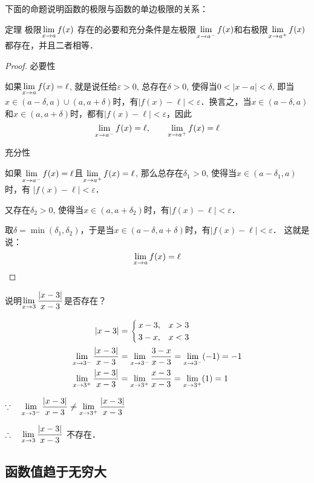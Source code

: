 下面的命题说明函数的极限与函数的单边极限的关系：

\begin{blk}{定理}
极限$\displaystyle\lim_{x\to a} f(x)$
存在的必要和充分条件是左极限$\displaystyle\lim_{x\to a^-} f(x)$和右极限$\displaystyle\lim_{x\to a^+} f(x)$都存在，并且二者相等．
\end{blk}

\begin{proof}
    必要性
    
    如果$\displaystyle\lim_{x\to a} f(x)=\ell$, 就是说任给$\varepsilon>0$, 总存在$\delta>0$,
使得当$0<|x-a|<\delta$, 即当$x\in (a-\delta,a)\cup(a,a+\delta)$时，有$|f(x)-\ell|<\varepsilon$．换言之，当$x\in (a-\delta,a)$和$x\in (a,a+\delta)$时，都有$|f (x) -\ell|<\varepsilon$，因此
\[\displaystyle\lim_{x\to a^-} f(x)=\ell,\qquad \displaystyle\lim_{x\to a^+} f(x)=\ell\]

充分性

如果$\displaystyle\lim_{x\to a^-} f(x)=\ell$且$\displaystyle\lim_{x\to a^+} f(x)=\ell$, 那么总存在$\delta_1>0$, 使得当$x\in(a-\delta_1,a)$时，有
$|f (x) -\ell|<\varepsilon$．

又存在$\delta_2>0$, 使得当$x\in (a,a+\delta_2)$时，有$|f (x) -\ell|<\varepsilon$．

取$\delta=\min(\delta_1,\delta_2)$，于是当$x\in(a-\delta,a+\delta)$时，有$|f (x) -\ell|<\varepsilon$．
这就是说：
\[\displaystyle\lim_{x\to a} f(x)=\ell\]
\end{proof}

\begin{example}
说明$\displaystyle\lim_{x\to 3}\dfrac{|x-3|}{x-3}$是否存在？
\end{example}

\begin{solution}
\[\begin{split}|x-3|&=\begin{cases}
    x-3, & x>3\\
    3-x, &x<3
\end{cases}\\
    \displaystyle\lim_{x\to 3^-}\dfrac{|x-3|}{x-3}&=\displaystyle\lim_{x\to 3^-}\dfrac{3-x}{x-3}=\displaystyle\lim_{x\to 3^-}(-1)=-1\\
    \displaystyle\lim_{x\to 3^+}\dfrac{|x-3|}{x-3}&=\displaystyle\lim_{x\to 3^+}\dfrac{x-3}{x-3}=\displaystyle\lim_{x\to 3^+}(1)=1
\end{split}\]

$\because\quad \displaystyle\lim_{x\to 3^-}\dfrac{|x-3|}{x-3}\ne \displaystyle\lim_{x\to 3^+}\dfrac{|x-3|}{x-3}$
    
$\therefore\quad \displaystyle\lim_{x\to 3}\dfrac{|x-3|}{x-3}$
不存在．
\end{solution}

\subsection{函数值趋于无穷大}

